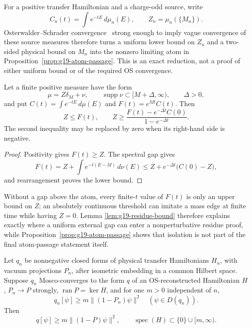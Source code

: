 For a positive transfer Hamiltonian and a charge-odd source, write
\[
 C_n(t)=\int e^{-tE}\,d\mu_n(E),\qquad
 Z_n=\mu_n(\{M_n\}).
\]
Osterwalder--Schrader convergence~\cite{OsterwalderSeiler1978} strong enough
to imply vague convergence
of these source measures therefore turns a uniform lower bound on $Z_n$
and a two-sided physical bound on $M_n$ into the nonzero limiting atom in
Proposition~\ref{prop:g19-atom-passage}.  This is an exact reduction, not a
proof of either uniform bound or of the required OS convergence.

\begin{lemma}
\label{lem:g19-residue-bound}
Let a finite positive measure have the form
\[
 \mu=Z\delta_M+\nu,
 \qquad \operatorname{supp}\nu\subset[M+\Delta,\infty),
 \qquad \Delta>0,
\]
and put $C(t)=\int e^{-tE}\,d\mu(E)$ and $F(t)=e^{Mt}C(t)$.  Then
\begin{equation}
 Z\le F(t),
 \qquad
 Z\ge
 \frac{F(t)-e^{-\Delta t}C(0)}{1-e^{-\Delta t}} .
 \label{eq:g19-residue-bound}
\end{equation}
The second inequality may be replaced by zero when its right-hand side is
negative.
\end{lemma}

\begin{proof}
Positivity gives $F(t)\ge Z$.  The spectral gap gives
\[
 F(t)
 =Z+\int e^{-t(E-M)}\,d\nu(E)
 \le Z+e^{-\Delta t}\bigl(C(0)-Z\bigr),
\]
and rearrangement proves the lower bound.
\end{proof}

Without a gap above the atom, every finite-$t$ value of $F(t)$ is only an
upper bound on $Z$; an absolutely continuous threshold can imitate a
mass edge at finite time while having $Z=0$.  Lemma
\ref{lem:g19-residue-bound} therefore explains exactly where a uniform
external gap can enter a nonperturbative residue proof, while
Proposition~\ref{prop:g19-atom-passage} shows that isolation is not part of
the final atom-passage statement itself.

\begin{proposition}
\label{prop:g19-mosco}
Let $q_n$ be nonnegative closed forms of physical transfer Hamiltonians
$H_n$, with vacuum projections $P_n$, after isometric embedding in a common
Hilbert space.  Suppose $q_n$ Mosco-converges to the form $q$ of an
OS-reconstructed Hamiltonian $H$, $P_n\to P$ strongly,
$\operatorname{ran}P=\ker H$, and for one $m>0$ independent of $n$,
\[
 q_n[\psi]\ge m\lVert(1-P_n)\psi\rVert^2
 \quad(\psi\in D(q_n)).
\]
Then
\[
 q[\psi]\ge m\lVert(1-P)\psi\rVert^2,
 \qquad
 \operatorname{spec}(H)\subset\{0\}\cup[m,\infty).
\]
\end{proposition}

